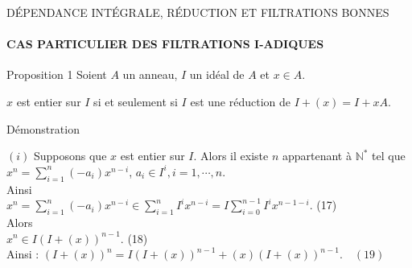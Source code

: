 \documentclass[11pt,a4paper]{beamer}
\begin{document}
		\begin{frame}{DÉPENDANCE INTÉGRALE, RÉDUCTION ET FILTRATIONS BONNES}
		\framesubtitle{CAS PARTICULIER DES FILTRATIONS I-ADIQUES}
		\begin{block}{Proposition 1}
				Soient $A$ un anneau, $I$ un idéal de $A$ et $x \in A$.
				\begin{center}
					$x$ est entier sur $I$ si et seulement si $I$ est une réduction de $I + (x) = I +xA $.
				\end{center}
		\end{block}
	\end{frame}
			\begin{frame}{Démonstration}
		\begin{block}{}
	$(i)$ Supposons que $x$ est entier sur $I$. Alors il existe $n $ appartenant à $ \mathbb{N^*}$ tel que \\ $x^n = \displaystyle \sum_{i=1}^{n}{(-a_i) x^{n-i}}$,  $a_i \in I^i, i=1, \cdots ,n$.\\ Ainsi \\ $x^n = \displaystyle \sum_{i=1}^{n}{(-a_i) x^{n-i}} \in \displaystyle \sum_{i=1}^{n}{I^i x^{n-i}} = I \displaystyle \sum_{i=0}^{n-1}{I^i x^{n-1-i}} $. (17)\\ Alors \\ $ x^n \in I(I+(x))^{n-1}.$ (18)\\
	Ainsi : $(I+(x))^n = I(I+(x))^{n-1} + (x)(I+(x))^{n-1}. \quad (19)$
		\end{block}
	\end{frame}
\end{document}
